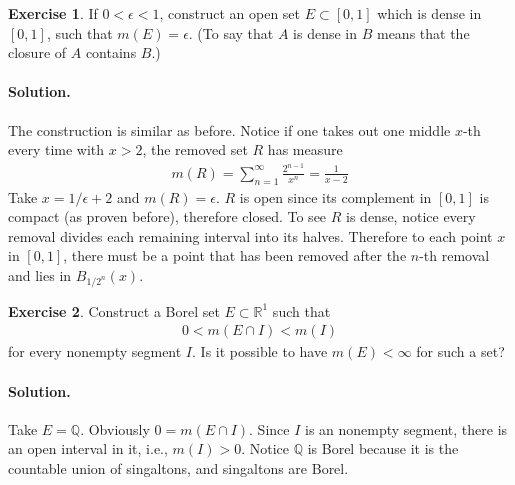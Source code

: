 \documentclass[10pt,a4paper]{book}
\theoremstyle{definition}
\newtheorem{exercise}{Exercise}[chapter]
\begin{document}
	\begin{exercise}
		If $ 0 < \epsilon < 1 $, construct an open set $ E \subset [0, 1] $ which is dense in $ [0, 1] $, such that $ m(E) = \epsilon $. (To say that $ A $ is dense in $ B $ means that the closure of $ A $ contains $ B $.)

		\paragraph{Solution. }
		The construction is similar as before. Notice if one takes out one middle $ x $-th every time with $ x > 2 $, the removed set $ R $ has measure
		\begin{align*}
			m(R) = \sum_{n=1}^{\infty} \frac {2 ^{n-1} }{x^n}  = \frac {1}{x - 2}
		\end{align*}
		Take $ x = 1/\epsilon + 2 $ and $ m(R) = \epsilon $. $ R $ is open since its complement in $ [0, 1] $ is compact (as proven before), therefore closed. To see $ R $ is dense, notice every removal divides each remaining interval into its halves. Therefore to each point $ x $ in $ [0, 1] $, there must be a point that has been removed after the $ n $-th removal and lies in $ B _{1/2^n} (x) $.

	\end{exercise}

	\begin{exercise}
		Construct a Borel set $ E \subset \mathbb{R}^1 $ such that
		\begin{align*}
			0 < m(E \cap I) < m(I)
		\end{align*}
		for every nonempty segment $ I $. Is it possible to have $ m(E) < \infty $ for such a set?
		\paragraph{Solution. }
		Take $ E = \mathbb{Q} $. Obviously $ 0 = m(E \cap I) $. Since $ I $ is an nonempty segment, there is an open interval in it, i.e., $ m(I) > 0 $. Notice $ \mathbb{Q} $ is Borel because it is the countable union of singaltons, and singaltons are Borel.
	\end{exercise}
\end{document}
